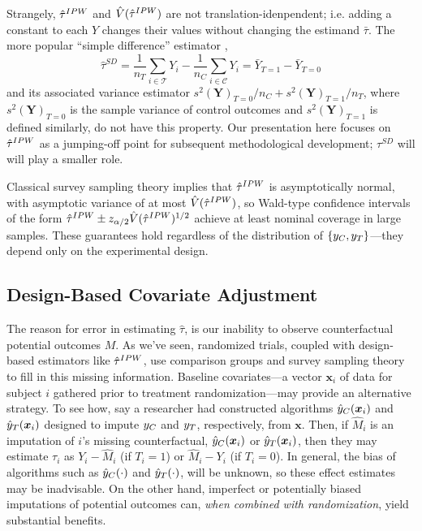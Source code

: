 Strangely, $\hat{\tau}^{IPW}$ and $\hat{V}(\hat{\tau}^{IPW})$ are not translation-idenpendent;
i.e. adding a constant to each $Y$ changes their values without
changing the estimand $\bar{\tau}$.
The more popular ``simple difference'' estimator \citep{neyman:1923},
\begin{equation}\label{eq:tauSD}
\hat{\tau}^{SD} = \frac{1}{n_T}\sum_{i \in \mathcal{T}}Y_i - \frac{1}{n_C}\sum_{i \in \mathcal{C}}Y_i=\bar{Y}_{T=1}-\bar{Y}_{T=0}
\end{equation}
and its associated variance estimator
$s^2(\bm{Y})_{T=0}/n_C+s^2(\bm{Y})_{T=1}/n_T$, where
$s^2(\bm{Y})_{T=0}$ is the sample variance of control outcomes
and
$s^2(\bm{Y})_{T=1}$ is defined similarly, do not have this property.
Our presentation here focuses on $\hat{\tau}^{IPW}$ as a jumping-off point for
subsequent methodological development;
$\tau^{SD}$ will will play a smaller role.


Classical survey sampling theory implies that $\hat{\tau}^{IPW}$ is
asymptotically normal, with asymptotic variance of at most
$\hat{V}(\hat{\tau}^{IPW})$, so Wald-type confidence intervals of the form
$\hat{\tau}^{IPW}\pm z_{\alpha/2}\hat{V}(\hat{\tau}^{IPW})^{1/2}$ achieve at least nominal coverage
in large samples.
These guarantees hold regardless of the distribution of
$\{y_C,y_T\}$---they depend only on the experimental design.



\subsection{Design-Based Covariate Adjustment}

The reason for error in estimating $\hat{\tau}$, is our inability to observe counterfactual
potential outcomes $M$.
As we've seen, randomized trials, coupled with design-based estimators
like $\hat{\tau}^{IPW}$, use comparison groups and survey sampling theory to
fill in this missing information.
Baseline covariates---a vector $\bm{x}_i$ of data for subject $i$
gathered prior to treatment randomization---may provide an alternative
strategy.
To see how, say a researcher had constructed algorithms $\hat{y}_C(\bm{x}_i)$ and
$\hat{y}_T(\bm{x}_i)$ designed to impute $y_C$ and $y_T$, respectively, from
$\bm{x}$.
Then, if $\hat{M}_i$ is an imputation of $i$'s missing counterfactual,
 $\hat{y}_C(\bm{x}_i)$ or $\hat{y}_T(\bm{x}_i)$, then they may estimate $\tau_i$ as $Y_i-\hat{M}_i$ (if $T_i=1$) or $\hat{M}_i-Y_i$ (if $T_i=0$).
In general, the bias of algorithms such as $\hat{y}_C(\cdot)$ and
$\hat{y}_T(\cdot)$, will be unknown, so these effect estimates may be inadvisable.
On the other hand, imperfect or potentially biased imputations of
potential outcomes can, \emph{when combined with randomization}, yield
substantial benefits.


